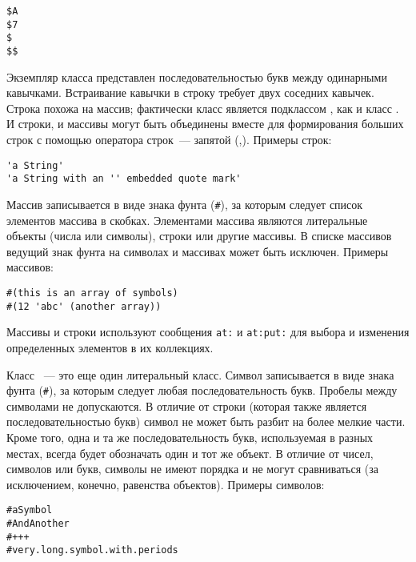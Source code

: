 \begin{lstlisting}
$A
$7
$
$$
\end{lstlisting}
    
Экземпляр класса  представлен последовательностью букв между одинарными кавычками. 
Встраивание кавычки в строку требует двух соседних кавычек. Строка похожа на массив; 
фактически класс  является подклассом , как и класс . 
И строки, и массивы могут быть объединены вместе для формирования больших строк 
с помощью оператора  строк\ --- запятой (,). Примеры строк:
    
\begin{lstlisting}
'a String'
'a String with an '' embedded quote mark'
\end{lstlisting}
    
Массив  записывается в виде знака фунта (\verb|#|), за которым следует список элементов 
массива в скобках. Элементами массива являются литеральные объекты (числа или символы), 
строки или другие массивы. В списке массивов ведущий знак фунта на символах 
и массивах может быть исключен. Примеры массивов:

\begin{lstlisting}
#(this is an array of symbols)
#(12 'abc' (another array))
\end{lstlisting}

\noindent
Массивы и строки используют сообщения \verb|at:| и \verb|at:put:| 
для выбора и изменения определенных элементов в их коллекциях.

Класс \ --- это еще один литеральный класс. Символ записывается в виде 
знака фунта (\verb|#|), за которым следует любая последовательность букв. 
Пробелы между символами не допускаются. В отличие от строки (которая также 
является последовательностью букв) символ не может быть разбит на более 
мелкие части. Кроме того, одна и та же последовательность букв, используемая 
в разных местах, всегда будет обозначать один и тот же объект. В отличие от 
чисел, символов или букв, символы не имеют порядка и не могут сравниваться 
(за исключением, конечно, равенства объектов). Примеры символов:

\begin{lstlisting}
#aSymbol
#AndAnother
#+++
#very.long.symbol.with.periods
\end{lstlisting}
